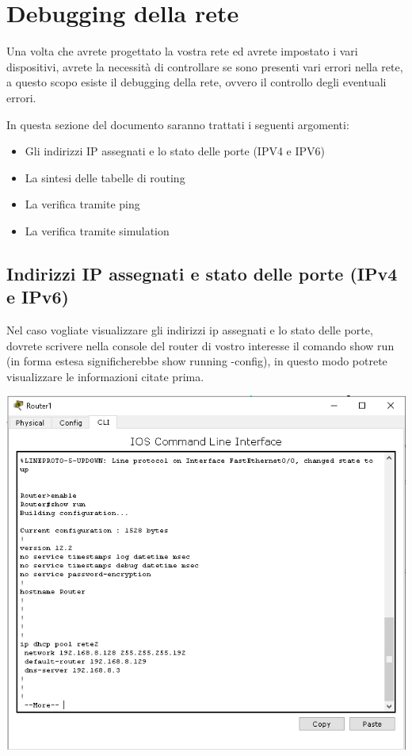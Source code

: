 \section{Debugging della rete}
Una volta che avrete progettato la vostra rete ed avrete impostato i vari dispositivi, avrete la necessità di controllare se sono presenti vari errori nella rete, a questo scopo esiste il debugging della rete, ovvero il controllo degli eventuali errori.

In questa sezione del documento saranno trattati i seguenti argomenti:

\begin{itemize}
    \item Gli indirizzi IP assegnati e lo stato delle porte (IPV4 e IPV6)
    \item La sintesi delle tabelle di routing
    \item La verifica tramite ping
    \item La verifica tramite simulation
\end{itemize}

\subsection{Indirizzi IP assegnati e stato delle porte (IPv4 e IPv6)}
Nel caso vogliate visualizzare gli indirizzi ip assegnati e lo stato delle porte, dovrete scrivere nella console del router di vostro interesse il comando show run (in forma estesa significherebbe show running -config), in questo modo potrete visualizzare le informazioni citate prima.

\begin{center}
    \includegraphics[width=0.8\linewidth]{images/04.debugging-rete/01.png}
\end{center}

